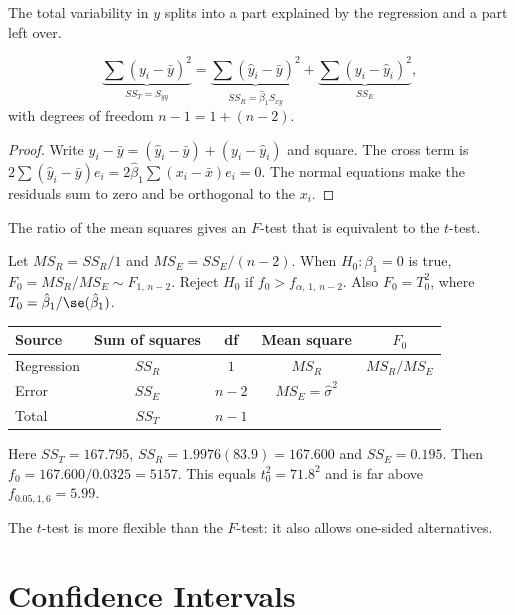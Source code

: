 The total variability in $y$ splits into a part explained by the regression and a part left over.

\begin{theorem}\label{thm:anova-reg}
\[ \underbrace{\sum(y_i-\bar{y})^2}_{SS_T=S_{yy}}=\underbrace{\sum(\hat{y}_i-\bar{y})^2}_{SS_R=\hat\beta_1S_{xy}}+\underbrace{\sum(y_i-\hat{y}_i)^2}_{SS_E}, \]
with degrees of freedom $n-1=1+(n-2)$.
\end{theorem}

\begin{proof}
Write $y_i-\bar{y}=(\hat{y}_i-\bar{y})+(y_i-\hat{y}_i)$ and square. The cross term is $2\sum(\hat{y}_i-\bar{y})e_i=2\hat\beta_1\sum(x_i-\bar{x})e_i=0$. The normal equations make the residuals sum to zero and be orthogonal to the $x_i$.
\end{proof}

The ratio of the mean squares gives an $F$-test that is equivalent to the $t$-test.

\begin{theorem}\label{thm:regF}
Let $MS_R=SS_R/1$ and $MS_E=SS_E/(n-2)$. When $H_0:\beta_1=0$ is true, $F_0=MS_R/MS_E\sim F_{1,\,n-2}$. Reject $H_0$ if $f_0>f_{\alpha,\,1,\,n-2}$. Also $F_0=T_0^2$, where $T_0=\hat\beta_1/\se(\hat\beta_1)$.
\end{theorem}

\begin{center}
\begin{tabular}{lcccc}
\toprule
Source & Sum of squares & df & Mean square & $F_0$ \\
\midrule
Regression & $SS_R$ & $1$ & $MS_R$ & $MS_R/MS_E$ \\
Error & $SS_E$ & $n-2$ & $MS_E=\hat\sigma^2$ & \\
Total & $SS_T$ & $n-1$ & & \\
\bottomrule
\end{tabular}
\end{center}

\begin{example}
Here $SS_T=167.795$, $SS_R=1.9976(83.9)=167.600$ and $SS_E=0.195$. Then $f_0=167.600/0.0325=5157$. This equals $t_0^2=71.8^2$ and is far above $f_{0.05,1,6}=5.99$.
\end{example}

The $t$-test is more flexible than the $F$-test: it also allows one-sided alternatives.

\section{Confidence Intervals}

